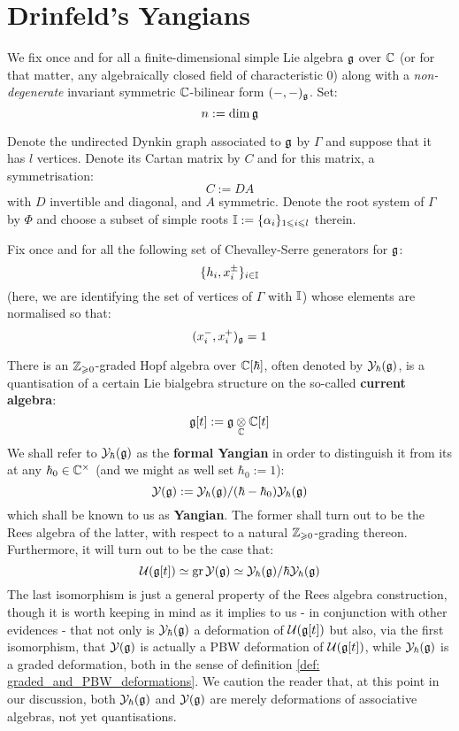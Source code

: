 \section{Drinfeld's Yangians}
    \begin{convention} \label{conv: a_fixed_semi_simple_lie_algebra}
        We fix once and for all a finite-dimensional simple Lie algebra $\mathfrak{g}$ over $\mathbb{C}$ (or for that matter, any algebraically closed field of characteristic $0$) along with a \textit{non-degenerate} invariant symmetric $\mathbb{C}$-bilinear form $(-, -)_{\mathfrak{g}}$. Set:
            $$n := \dim \mathfrak{g}$$
            
        Denote the undirected Dynkin graph associated to $\mathfrak{g}$ by $\Gamma$ and suppose that it has $l$ vertices. Denote its Cartan matrix by $C$ and for this matrix, a symmetrisation:
            $$C := DA$$
        with $D$ invertible and diagonal, and $A$ symmetric. Denote the root system of $\Gamma$ by $\Phi$ and choose a subset of simple roots $\mathbb{I} := \{\alpha_i\}_{1 \leqslant i \leqslant l}$ therein. 
        
        Fix once and for all the following set of Chevalley-Serre generators for $\mathfrak{g}$:
            $$\{h_i, x_i^{\pm}\}_{i \in \mathbb{I}}$$
        (here, we are identifying the set of vertices of $\Gamma$ with $\mathbb{I}$) whose elements are normalised so that:
            $$(x_i^-, x_i^+)_{\mathfrak{g}} = 1$$
    \end{convention}

    There is an $\mathbb{Z}_{\geqslant 0}$-graded Hopf algebra over $\mathbb{C}[\hbar]$, often denoted by $\mathcal{Y}_{\hbar}(\mathfrak{g})$, is a quantisation of a certain Lie bialgebra structure on the so-called \textbf{current algebra}:
        $$\g[t] := \g \tensor_{\bbC} \bbC[t]$$
    We shall refer to $\mathcal{Y}_{\hbar}(\mathfrak{g})$ as the \textbf{formal Yangian} in order to distinguish it from its  at any $\hbar_0 \in \bbC^{\x}$ (and we might as well set $\hbar_0 := 1$):
        $$\mathcal{Y}(\mathfrak{g}) := \mathcal{Y}_{\hbar}(\mathfrak{g})/(\hbar - \hbar_0)\mathcal{Y}_{\hbar}(\mathfrak{g})$$
    which shall be known to us as  \textbf{Yangian}. The former shall turn out to be the Rees algebra of the latter, with respect to a natural $\mathbb{Z}_{\geqslant 0}$-grading thereon. Furthermore, it will turn out to be the case that:
        $$\mathcal{U}( \mathfrak{g}[t] ) \simeq \operatorname{gr} \mathcal{Y}(\mathfrak{g}) \simeq \mathcal{Y}_{\hbar}(\mathfrak{g})/\hbar\mathcal{Y}_{\hbar}(\mathfrak{g})$$
    The last isomorphism is just a general property of the Rees algebra construction, though it is worth keeping in mind as it implies to us - in conjunction with other evidences - that not only is $\mathcal{Y}_{\hbar}(\mathfrak{g})$ a deformation of $\mathcal{U}( \mathfrak{g}[t] )$ but also, via the first isomorphism, that $\mathcal{Y}(\mathfrak{g})$ is actually a PBW deformation of $\mathcal{U}( \mathfrak{g}[t] )$, while $\mathcal{Y}_{\hbar}(\mathfrak{g})$ is a graded deformation, both in the sense of definition \ref{def: graded_and_PBW_deformations}. We caution the reader that, at this point in our discussion, both $\mathcal{Y}_{\hbar}(\mathfrak{g})$ and $\mathcal{Y}(\mathfrak{g})$ are merely deformations of associative algebras, not yet quantisations. 

